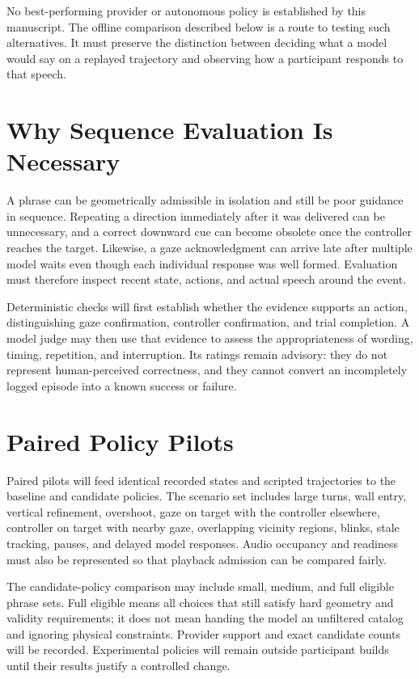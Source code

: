 No best-performing provider or autonomous policy is established by this manuscript. The offline comparison described below is a route to testing such alternatives. It must preserve the distinction between deciding what a model would say on a replayed trajectory and observing how a participant responds to that speech.

\section{Why Sequence Evaluation Is Necessary}
A phrase can be geometrically admissible in isolation and still be poor guidance in sequence. Repeating a direction immediately after it was delivered can be unnecessary, and a correct downward cue can become obsolete once the controller reaches the target. Likewise, a gaze acknowledgment can arrive late after multiple model waits even though each individual response was well formed. Evaluation must therefore inspect recent state, actions, and actual speech around the event.

Deterministic checks will first establish whether the evidence supports an action, distinguishing gaze confirmation, controller confirmation, and trial completion. A model judge may then use that evidence to assess the appropriateness of wording, timing, repetition, and interruption. Its ratings remain advisory: they do not represent human-perceived correctness, and they cannot convert an incompletely logged episode into a known success or failure.

\section{Paired Policy Pilots}
Paired pilots will feed identical recorded states and scripted trajectories to the baseline and candidate policies. The scenario set includes large turns, wall entry, vertical refinement, overshoot, gaze on target with the controller elsewhere, controller on target with nearby gaze, overlapping vicinity regions, blinks, stale tracking, pauses, and delayed model responses. Audio occupancy and readiness must also be represented so that playback admission can be compared fairly.

The candidate-policy comparison may include small, medium, and full eligible phrase sets. Full eligible means all choices that still satisfy hard geometry and validity requirements; it does not mean handing the model an unfiltered catalog and ignoring physical constraints. Provider support and exact candidate counts will be recorded. Experimental policies will remain outside participant builds until their results justify a controlled change.

